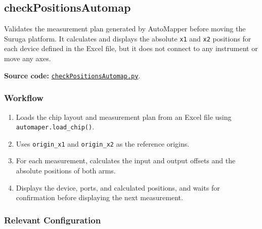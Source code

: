 
\subsection{checkPositionsAutomap}

Validates the measurement plan generated by AutoMapper before moving the Suruga platform. It calculates and displays the absolute \texttt{x1} and \texttt{x2} positions for each device defined in the Excel file, but it does not connect to any instrument or move any axes.

\textbf{Source code:}
\href{https://github.com/niospinamev2/SurugaSeikiHex/blob/main/rutinas/checkPositionsAutomap.py}
{\texttt{checkPositionsAutomap.py}}.

\subsubsection{Workflow}

\begin{enumerate}
    \item Loads the chip layout and measurement plan from an Excel file using \texttt{automaper.load\_chip()}.

    \item Uses \texttt{origin\_x1} and \texttt{origin\_x2} as the reference origins.

    \item For each measurement, calculates the input and output offsets and the absolute positions of both arms.

    \item Displays the device, ports, and calculated positions, and waits for confirmation before displaying the next measurement.
\end{enumerate}

\subsubsection{Relevant Configuration}


\footnotesize

